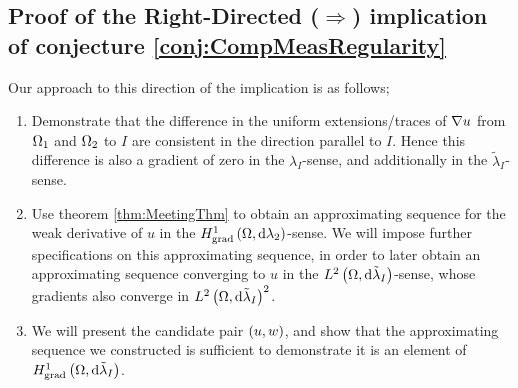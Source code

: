 \documentclass[11pt]{report}
\theoremstyle{plain}
\newcommand{\tlambda}{\tilde{\lambda}}
\begin{document}
\subsection*{Proof of the Right-Directed ($\Rightarrow$) implication of conjecture \ref{conj:CompMeasRegularity}}
Our approach to this direction of the implication is as follows;
\begin{enumerate}
	\item Demonstrate that the difference in the uniform extensions/traces of $\nabla u$ from $\Omega_1$ and $\Omega_2$ to $I$ are consistent in the direction parallel to $I$.
	Hence this difference is also a gradient of zero in the $\lambda_I$-sense, and additionally in the $\tlambda_I$-sense.
	\item Use theorem \ref{thm:MeetingThm} to obtain an approximating sequence for the weak derivative of $u$ in the $H^1_\mathrm{grad}\left( \Omega, \mathrm{d}\lambda_2 \right)$-sense.
	We will impose further specifications on this approximating sequence, in order to later obtain an approximating sequence converging to $u$ in the $\ltwo{\ddom}{\tlambda_I}$-sense, whose gradients also converge in $\ltwo{\ddom}{\tlambda_I}^2$.
	\item We will present the candidate pair $\left( u,w \right)$, and show that the approximating sequence we constructed is sufficient to demonstrate it is an element of $\gradSob{\ddom}{\tlambda_I}$.
\end{enumerate}
\end{document}
